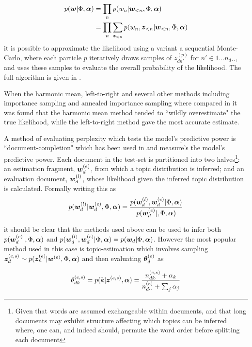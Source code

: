 \begin{align}
p(\bm w|\Phi, \bm \alpha) & = \prod_n p(w_n | \bm w_{<n}, \Phi, \bm \alpha) \\
& = \prod_n \sum_{\bm z_{<n}} p(w_n, \bm z_{<n}| \bm w_{<n}, \Phi, \bm \alpha)
\end{align}
it is possible to approximate the likelihood using a variant a sequential Monte-Carlo, where each particle $p$ iteratively draws samples of $z^{(p)}_{dn'}$ for $n' \in 1 \ldots n_{d\cdot\cdot}$, and uses these samples to evaluate the overall probability of the likelihood. The full algorithm is given in \cite{Wallach2009}.

When the harmonic mean, left-to-right and several other methods including importance sampling and annealed importance sampling where compared in \cite{Wallach2009} it was found that the harmonic mean method tended to ``wildly overestimate" the true likelihood, while the left-to-right method gave the most accurate estimate.

A method of evaluating perplexity which tests the model's predictive power is ``document-completion" which has been used in \cite{Virtanen2012a}\cite{Asuncion2012}\cite{RosenZvi2004} and measure's the model's predictive power. Each document in the test-set is partitioned into two halves\footnote{Given that words are assumed exchangeable within documents, and that long documents may exhibit structure affecting which topics can be inferred where, one can, and indeed should, permute the word order before splitting each document}: an estimation fragment, $\bm w_d^{(e)}$, from which a topic distribution is inferred; and an evaluation document, $\bm w_d^{(l)}$, whose likelihood given the inferred topic distribution is calculated. Formally writing this as
\begin{align}
p(\bm w_d^{(l)}|\bm w_d^{(e)}, \Phi, \bm \alpha) = \frac{p(\bm w_d^{(l)},\bm w_d^{(e)} |\Phi, \bm \alpha)}{p(\bm w_d^{(e)}|, \Phi, \bm \alpha)}
\end{align}

it should be clear that the methods used above can be used to infer both $p(\bm w_d^{(e)}|, \Phi, \bm \alpha)$ and $p(\bm w_d^{(l)},\bm w_d^{(e)} | \Phi, \bm \alpha) = p(\bm w_d | \Phi, \bm \alpha)$. However the most  popular method used in this case is topic-estimation which involves sampling $\bm z_d^{(e,s)} \sim p(\bm z_n^{(e)} | \bm w^{(e)}, \Phi, \bm \alpha)$ and then evaluating $\bm \theta_d^{(e)}$ as

\begin{align}
\theta^{(e,s)}_{dk} = p(k | \bm z^{(e,s)}, \bm \alpha) = \frac{n^{(e,s)}_{dk\cdot} + \alpha_k}{n^{(e)}_{d\cdot\cdot} + \sum_j \alpha_j}
\end{align}

